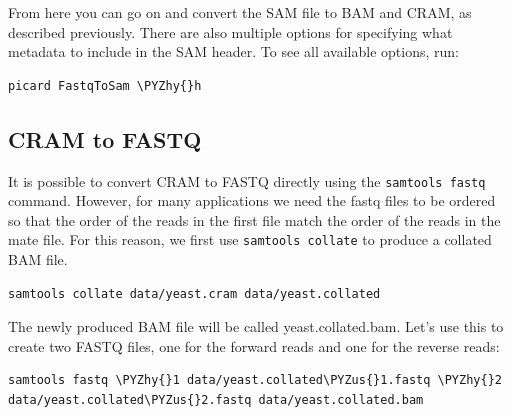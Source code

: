 \documentclass[11pt]{article}
\makeatletter
\def\PYZus{\char`\_}
\def\PYZhy{\char`\-}
\newcommand{\boxspacing}{\kern\kvtcb@left@rule\kern\kvtcb@boxsep}
\newcommand{\prompt}[4]{
        {\ttfamily\llap{{\color{#2}[#3]:\hspace{3pt}#4}}\vspace{-\baselineskip}}
    }
\makeatother
\begin{document}
    From here you can go on and convert the SAM file to BAM and CRAM, as
described previously. There are also multiple options for specifying
what metadata to include in the SAM header. To see all available
options, run:

    \begin{tcolorbox}[breakable, size=fbox, boxrule=1pt, pad at break*=1mm,colback=cellbackground, colframe=cellborder]
\prompt{In}{incolor}{ }{\boxspacing}
\begin{Verbatim}[commandchars=\\\{\}]
picard FastqToSam \PYZhy{}h
\end{Verbatim}
\end{tcolorbox}

    \hypertarget{cram-to-fastq}{%
\subsection{CRAM to FASTQ}\label{cram-to-fastq}}

It is possible to convert CRAM to FASTQ directly using the
\texttt{samtools\ fastq} command. However, for many applications we need
the fastq files to be ordered so that the order of the reads in the
first file match the order of the reads in the mate file. For this
reason, we first use \texttt{samtools\ collate} to produce a collated
BAM file.

    \begin{tcolorbox}[breakable, size=fbox, boxrule=1pt, pad at break*=1mm,colback=cellbackground, colframe=cellborder]
\prompt{In}{incolor}{ }{\boxspacing}
\begin{Verbatim}[commandchars=\\\{\}]
samtools collate data/yeast.cram data/yeast.collated
\end{Verbatim}
\end{tcolorbox}

    The newly produced BAM file will be called yeast.collated.bam. Let's use
this to create two FASTQ files, one for the forward reads and one for
the reverse reads:

    \begin{tcolorbox}[breakable, size=fbox, boxrule=1pt, pad at break*=1mm,colback=cellbackground, colframe=cellborder]
\prompt{In}{incolor}{ }{\boxspacing}
\begin{Verbatim}[commandchars=\\\{\}]
samtools fastq \PYZhy{}1 data/yeast.collated\PYZus{}1.fastq \PYZhy{}2 data/yeast.collated\PYZus{}2.fastq data/yeast.collated.bam
\end{Verbatim}
\end{tcolorbox}
\end{document}
